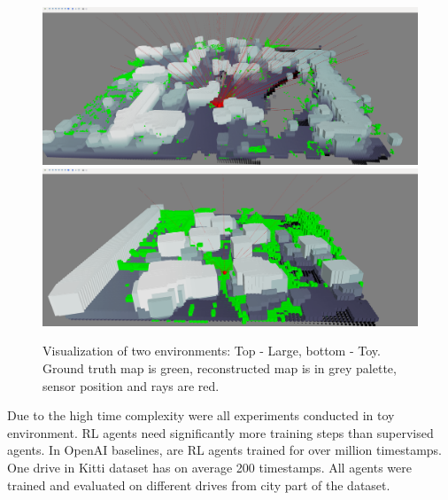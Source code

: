 \begin{figure}[!h]
\includegraphics[width=1\linewidth]{fig/large.png}
\includegraphics[width=1\linewidth]{fig/toy.png}
\caption[Environment visualization.]{Visualization of two environments: Top - Large, bottom - Toy. Ground truth map is green, reconstructed map is in grey palette, sensor position and rays are red.}
\label{fig:visualization}
\end{figure}
\renewcommand{\thefootnote}{\fnsymbol{footnote}}
\clearpage
Due to the high time complexity were all experiments conducted in toy environment. RL agents need significantly more training steps than supervised agents. In OpenAI baselines, \cite{openai2017} are RL agents trained for over million timestamps. One drive in Kitti dataset has on average 200 timestamps. All agents were trained and evaluated on different drives from city part of the dataset.

